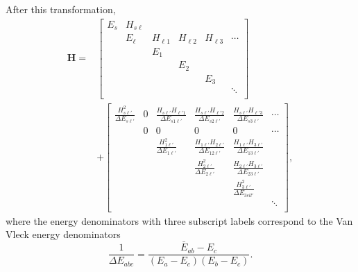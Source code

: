 \documentclass[12pt]{mitthesis}
\begin{document}
After this transformation, 
\begin{equation}
  \begin{split}
    \mathbf{H} =&
    \begin{bmatrix}
    E_s & H_{s \ell} \\
    & E_\ell &  H_{\ell 1} & H_{\ell 2} & H_{\ell 3} & \dotsm \\
    & & E_1 \\
    & & & E_2 \\
    & & & & E_3 \\
    & & & & & \ddots \\
    \end{bmatrix}\\
    & +
    \begin{bmatrix}
    \frac{H_{s \ell'}^2}{\Delta E_{s \ell'}} & 0 &
    \frac{H_{s \ell'}H_{\ell' 1}}{\Delta E_{s 1 \ell'}} &
    \frac{H_{s \ell'}H_{\ell' 2}}{\Delta E_{s 2 \ell'}} &
    \frac{H_{s \ell'}H_{\ell' 3}}{\Delta E_{s 3 \ell'}} & \dotsm \\
    & 0 & 0 & 0 & 0 & \dotsm \\
    & & \frac{H_{1 \ell'}^2}{\Delta E_{1 \ell'}} & 
         \frac{H_{1 \ell'}H_{2 \ell'}}{\Delta E_{1 2 \ell'}} &
         \frac{H_{1 \ell'}H_{3 \ell'}}{\Delta E_{1 3 \ell'}} \\
    & & & \frac{H_{2 \ell'}^2}{\Delta E_{2 \ell'}} &
          \frac{ H_{2 \ell'}H_{3 \ell'}}{ \Delta E_{2 3 \ell'}} \\
    & & & & \frac{H_{3 \ell'}^2}{ \Delta E_{3 ell'}} \\
    & & & & & \ddots \\
    \end{bmatrix},
  \end{split}
\end{equation}
where the energy denominators with three subscript labels correspond
to the Van Vleck energy denominators
\begin{equation}
  \frac{1}{\Delta E_{a b c}} = 
  \frac{\bar{E}_{a b} - E_c}
  {(E_a - E_c)(E_b - E_c)}.
\end{equation}
\end{document}
